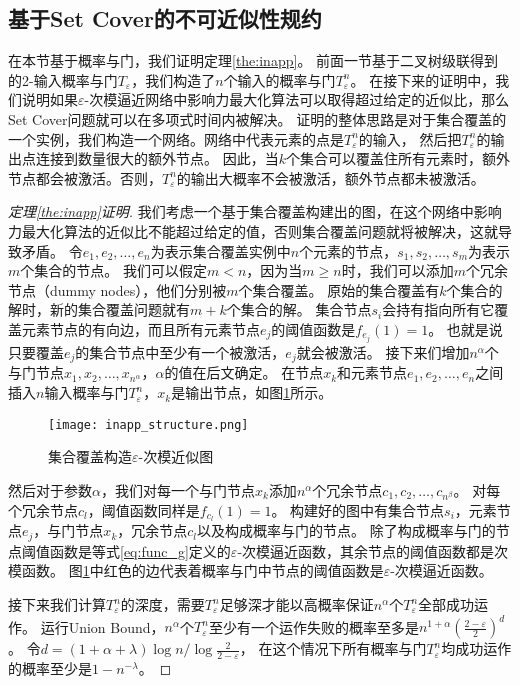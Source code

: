 \subsection{基于Set Cover的不可近似性规约}
在本节基于概率与门，我们证明定理\ref{the:inapp}。
前面一节基于二叉树级联得到的2-输入概率与门$T_\varepsilon$，我们构造了$n$个输入的概率与门$T_\varepsilon^n$。
在接下来的证明中，我们说明如果$\varepsilon$-次模逼近网络中影响力最大化算法可以取得超过给定的近似比，那么Set Cover问题就可以在多项式时间内被解决。
证明的整体思路是对于集合覆盖的一个实例，我们构造一个网络。网络中代表元素的点是$T_\varepsilon^n$的输入，
然后把$T_\varepsilon^n$的输出点连接到数量很大的额外节点。
因此，当$k$个集合可以覆盖住所有元素时，额外节点都会被激活。否则，$T_\varepsilon^n$的输出大概率不会被激活，额外节点都未被激活。
\begin{proof}[定理\ref{the:inapp}证明]
我们考虑一个基于集合覆盖构建出的图，在这个网络中影响力最大化算法的近似比不能超过给定的值，否则集合覆盖问题就将被解决，这就导致矛盾。
令$e_1, e_2, \dots, e_n$为表示集合覆盖实例中$n$个元素的节点，$s_1, s_2, \dots, s_m$为表示$m$个集合的节点。
我们可以假定$m<n$，因为当$m\geq n$时，我们可以添加$m$个冗余节点（dummy nodes），他们分别被$m$个集合覆盖。
原始的集合覆盖有$k$个集合的解时，新的集合覆盖问题就有$m+k$个集合的解。
集合节点$s_i$会持有指向所有它覆盖元素节点的有向边，而且所有元素节点$e_j$的阈值函数是$f_{e_j}(1)=1$。
也就是说只要覆盖$e_j$的集合节点中至少有一个被激活，$e_j$就会被激活。
接下来们增加$n^\alpha$个与门节点$x_1, x_2, \dots, x_{n^\alpha}$，$\alpha$的值在后文确定。
在节点$x_k$和元素节点$e_1, e_2, \dots, e_n$之间插入$n$输入概率与门$T_\varepsilon^n$，$x_k$是输出节点，如图\ref{fig:inapp_structure}所示。
\begin{figure}[h]
	\centering
	\texttt{[image: inapp\_structure.png]}
	\caption{集合覆盖构造$\varepsilon$-次模近似图}\label{fig:inapp_structure}
\end{figure}
然后对于参数$\alpha$，我们对每一个与门节点$x_k$添加$n^\alpha$个冗余节点$c_1, c_2, \dots, c_{n^\beta}$。
对每个冗余节点$c_l$，阈值函数同样是$f_{c_l}(1)=1$。
构建好的图中有集合节点$s_i$，元素节点$e_j$，与门节点$x_k$，冗余节点$c_l$以及构成概率与门的节点。
除了构成概率与门的节点阈值函数是等式\ref{eq:func_g}定义的$\varepsilon$-次模逼近函数，其余节点的阈值函数都是次模函数。
图\ref{fig:inapp_structure}中红色的边代表着概率与门中节点的阈值函数是$\varepsilon$-次模逼近函数。

接下来我们计算$T_\varepsilon^n$的深度，需要$T_\varepsilon^n$足够深才能以高概率保证$n^\alpha$个$T_\varepsilon^n$全部成功运作。
运行Union Bound，$n^\alpha$个$T_\varepsilon^n$至少有一个运作失败的概率至多是$n^{1+\alpha}(\frac{2-\varepsilon}{2})^{d}$。
令$d = (1+\alpha+\lambda)\log n / \log{\frac{2}{2-\varepsilon}}$，
在这个情况下所有概率与门$T_\varepsilon^n$均成功运作的概率至少是$1-n^{-\lambda}$。


\end{proof}
